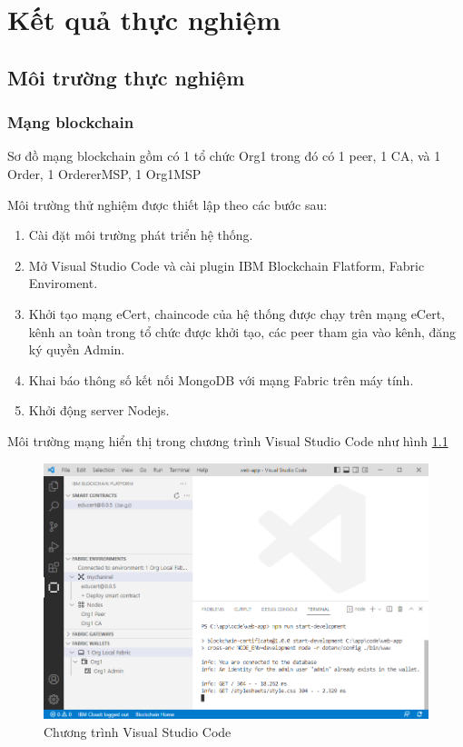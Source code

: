 \chapter{Kết quả thực nghiệm}
\section{Môi trường thực nghiệm}
\subsection{Mạng blockchain}

Sơ đồ mạng blockchain gồm có 1 tổ chức Org1 trong đó có 1 peer, 1 CA, và 1 Order, 1 OrdererMSP, 1 Org1MSP
 
Môi trường thử nghiệm được thiết lập theo các bước sau:
\begin{enumerate}
\item Cài đặt môi trường phát triển hệ thống.
\item Mở Visual Studio Code và cài plugin IBM Blockchain Flatform, Fabric Enviroment.
\item Khởi tạo mạng eCert, chaincode của hệ thống được chạy trên mạng eCert, kênh an toàn trong tổ chức được khởi tạo, các peer tham gia vào kênh, đăng ký quyền Admin.
\item Khai báo thông số kết nối MongoDB với mạng Fabric trên máy tính.
\item Khởi động server Nodejs.
\end{enumerate}

Môi trường mạng hiển thị trong chương trình Visual Studio Code như hình \ref{fig:ide_start}
\begin{figure}[htbp]
\centering
\includegraphics[width=.9\linewidth]{img/ide_start.PNG}
\caption{Chương trình Visual Studio Code}
\label{fig:ide_start}
\end{figure}

